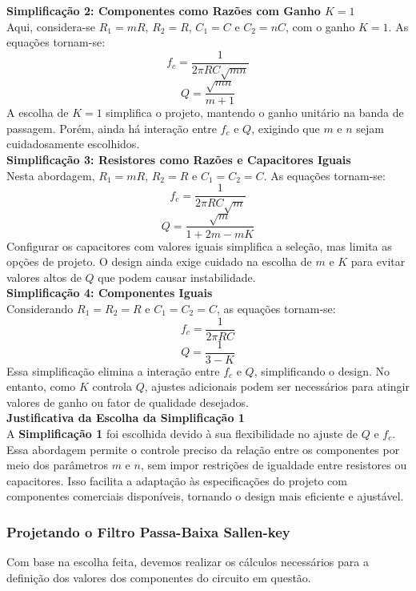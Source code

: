 \documentclass[a4paper, 12pt]{article}
\begin{document}
\textbf{Simplificação 2: Componentes como Razões com Ganho \(K = 1\)}\\

Aqui, considera-se \(R_1 = mR\), \(R_2 = R\), \(C_1 = C\) e \(C_2 = nC\), com o ganho \(K = 1\). As equações tornam-se:
\[
f_c = \frac{1}{2\pi RC\sqrt{mn}}
\]
\[
Q = \frac{\sqrt{mn}}{m + 1}
\]
A escolha de \(K = 1\) simplifica o projeto, mantendo o ganho unitário na banda de passagem. Porém, ainda há interação entre \(f_c\) e \(Q\), exigindo que \(m\) e \(n\) sejam cuidadosamente escolhidos.\\

\textbf{Simplificação 3: Resistores como Razões e Capacitores Iguais}\\

Nesta abordagem, \(R_1 = mR\), \(R_2 = R\) e \(C_1 = C_2 = C\). As equações tornam-se:
\[
f_c = \frac{1}{2\pi RC\sqrt{m}}
\]
\[
Q = \frac{\sqrt{m}}{1 + 2m - mK}
\]
Configurar os capacitores com valores iguais simplifica a seleção, mas limita as opções de projeto. O design ainda exige cuidado na escolha de \(m\) e \(K\) para evitar valores altos de \(Q\) que podem causar instabilidade.\\

\textbf{Simplificação 4: Componentes Iguais}\\

Considerando \(R_1 = R_2 = R\) e \(C_1 = C_2 = C\), as equações tornam-se:
\[
f_c = \frac{1}{2\pi RC}
\]
\[
Q = \frac{1}{3 - K}
\]
Essa simplificação elimina a interação entre \(f_c\) e \(Q\), simplificando o design. No entanto, como \(K\) controla \(Q\), ajustes adicionais podem ser necessários para atingir valores de ganho ou fator de qualidade desejados.\\

\textbf{Justificativa da Escolha da Simplificação 1}\\

A \textbf{Simplificação 1} foi escolhida devido à sua flexibilidade no ajuste de \(Q\) e \(f_c\). Essa abordagem permite o controle preciso da relação entre os componentes por meio dos parâmetros \(m\) e \(n\), sem impor restrições de igualdade entre resistores ou capacitores. Isso facilita a adaptação às especificações do projeto com componentes comerciais disponíveis, tornando o design mais eficiente e ajustável.\\





\subsubsection{Projetando o Filtro Passa-Baixa Sallen-key}
Com base na escolha feita, devemos realizar os cálculos necessários para a definição dos valores dos componentes do circuito em questão.\\
\end{document}
